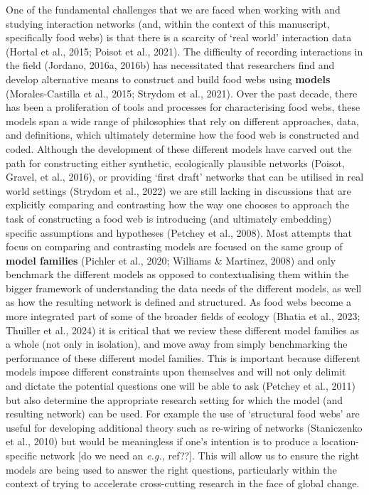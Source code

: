 \documentclass[
]{article}
\begin{document}
One of the fundamental challenges that we are faced when working with
and studying interaction networks (and, within the context of this
manuscript, specifically food webs) is that there is a scarcity of `real
world' interaction data (Hortal et al., 2015; Poisot et al., 2021). The
difficulty of recording interactions in the field (Jordano, 2016a,
2016b) has necessitated that researchers find and develop alternative
means to construct and build food webs using \textbf{models}
(Morales-Castilla et al., 2015; Strydom et al., 2021). Over the past
decade, there has been a proliferation of tools and processes for
characterising food webs, these models span a wide range of philosophies
that rely on different approaches, data, and definitions, which
ultimately determine how the food web is constructed and coded. Although
the development of these different models have carved out the path for
constructing either synthetic, ecologically plausible networks (Poisot,
Gravel, et al., 2016), or providing `first draft' networks that can be
utilised in real world settings (Strydom et al., 2022) we are still
lacking in discussions that are explicitly comparing and contrasting how
the way one chooses to approach the task of constructing a food web is
introducing (and ultimately embedding) specific assumptions and
hypotheses (Petchey et al., 2008). Most attempts that focus on comparing
and contrasting models are focused on the same group of \textbf{model
families} (Pichler et al., 2020; Williams \& Martinez, 2008) and only
benchmark the different models as opposed to contextualising them within
the bigger framework of understanding the data needs of the different
models, as well as how the resulting network is defined and structured.
As food webs become a more integrated part of some of the broader fields
of ecology (Bhatia et al., 2023; Thuiller et al., 2024) it is critical
that we review these different model families as a whole (not only in
isolation), and move away from simply benchmarking the performance of
these different model families. This is important because different
models impose different constraints upon themselves and will not only
delimit and dictate the potential questions one will be able to ask
(Petchey et al., 2011) but also determine the appropriate research
setting for which the model (and resulting network) can be used. For
example the use of `structural food webs' are useful for developing
additional theory such as re-wiring of networks (Staniczenko et al.,
2010) but would be meaningless if one's intention is to produce a
location-specific network {[}do we need an \emph{e.g.,} ref??{]}. This
will allow us to ensure the right models are being used to answer the
right questions, particularly within the context of trying to accelerate
cross-cutting research in the face of global change.
\end{document}
